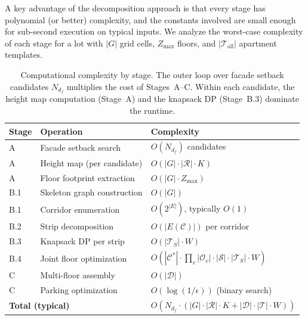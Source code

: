 \documentclass[11pt,a4paper]{article}
\newcommand{\calT}{\mathcal{T}}
\newcommand{\calS}{\mathcal{S}}
\newcommand{\calC}{\mathcal{C}}
\newcommand{\calR}{\mathcal{R}}
\newcommand{\calO}{\mathcal{O}}
\begin{document}
A key advantage of the decomposition approach is that every stage has
polynomial (or better) complexity, and the constants involved are small
enough for sub-second execution on typical inputs. We analyze the
worst-case complexity of each stage for a lot with $|G|$ grid cells,
$Z_{\max}$ floors, and $|\calT_{\text{all}}|$ apartment templates.

\begin{table}[h]
\centering
\begin{tabular}{lll}
\toprule
Stage & Operation & Complexity \\
\midrule
A & Facade setback search & $O(N_{d_f})$ candidates \\
A & Height map (per candidate) & $O(|G| \cdot |\calR| \cdot K)$ \\
A & Floor footprint extraction & $O(|G| \cdot Z_{\max})$ \\
B.1 & Skeleton graph construction & $O(|G|)$ \\
B.1 & Corridor enumeration & $O(2^{|E|})$, typically $O(1)$ \\
B.2 & Strip decomposition & $O(|E(\calC)|)$ per corridor \\
B.3 & Knapsack DP per strip & $O(|\calT_S| \cdot W)$ \\
B.4 & Joint floor optimization & $O(|\calC^*| \cdot \prod_v |\calO_v| \cdot |\calS| \cdot |\calT_S| \cdot W)$ \\
C & Multi-floor assembly & $O(|\mathcal{D}|)$ \\
C & Parking optimization & $O(\log(1/\epsilon))$ (binary search) \\
\midrule
\multicolumn{2}{l}{\textbf{Total (typical)}} & $O(N_{d_f} \cdot (|G| \cdot |\calR| \cdot K + |\mathcal{D}| \cdot |\calT| \cdot W))$ \\
\bottomrule
\end{tabular}
\caption{Computational complexity by stage. The outer loop over facade
setback candidates $N_{d_f}$ multiplies the cost of Stages~A--C. Within
each candidate, the height map computation (Stage~A) and the knapsack DP
(Stage~B.3) dominate the runtime.}
\label{tab:complexity}
\end{table}
\end{document}
